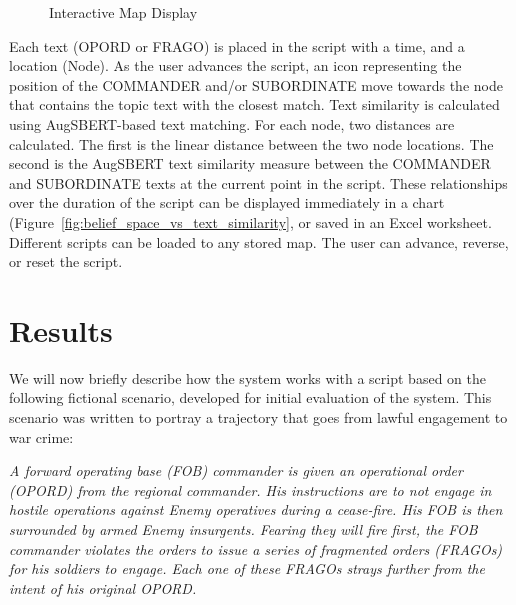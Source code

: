 \documentclass[11pt,dvipdfm]{article}
\begin{document}
\begin{figure}[!htbp]
	\centering
	\caption{\label{fig:mapdisplay1} Interactive Map Display}
\end{figure}

Each text (OPORD or FRAGO) is placed in the script with a time, and a location (Node). As the user advances the script, an icon representing the position of the COMMANDER and/or SUBORDINATE move towards the node that contains the topic text with the closest match. Text similarity is calculated using AugSBERT-based text matching. For each node, two distances are calculated. The first is the linear distance between the two node locations. The second is the AugSBERT text similarity measure between the COMMANDER and SUBORDINATE texts at the current point in the script. These relationships over the duration of the script can be displayed immediately in a chart (Figure~\ref{fig:belief_space_vs_text_similarity}, or saved in an Excel worksheet. Different scripts can be loaded to any stored map. The user can advance, reverse, or reset the script. 



\section{Results}
\label{sec:results}
We will now briefly describe how the system works with a script based on the following fictional scenario, developed for initial evaluation of the system. This scenario was written to portray a trajectory that goes from lawful engagement to war crime:

\begin{displayquote}
	\textit{A forward operating base (FOB) commander is given an operational order (OPORD) from the regional commander. His instructions are to not engage in hostile operations against Enemy operatives during a cease-fire. His FOB is then surrounded by armed Enemy insurgents. Fearing they will fire first, the FOB commander violates the orders to issue a series of fragmented orders (FRAGOs) for his soldiers to engage. Each one of these FRAGOs strays further from the intent of his original OPORD.}
\end{displayquote}
\end{document}
